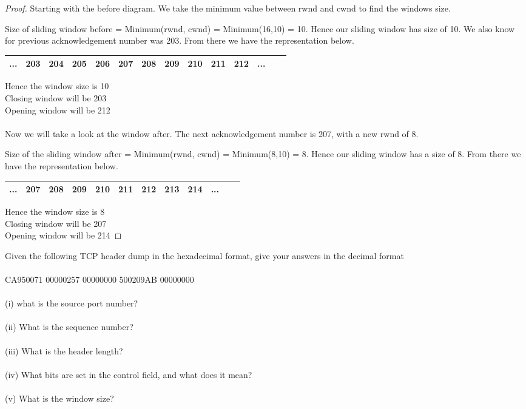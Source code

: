 \documentclass[12pt]{article}
\newenvironment{exercise}[2][Exercise]{\begin{trivlist}
\item[\hskip \labelsep {\bfseries #1}\hskip \labelsep {\bfseries #2.}]}{\end{trivlist}}
\begin{document}
\begin{proof}
Starting with the before diagram. We take the minimum value between rwnd and cwnd to find the windows size.

Size of sliding window before = Minimum(rwnd, cwnd) = Minimum(16,10) = 10. Hence our sliding window has size of 10. We also know for previous acknowledgement number was 203. From there we have the representation below. 

\begin{center}
\begin{tabular}{|c|c|c|c|c|c|c|c|c|c|c|c|c|c|}
\hline
 ... & 203 & 204 & 205 & 206 & 207 & 208 & 209 & 210 & 211 & 212 & ... \\
 \hline 
\end{tabular}
\end{center}
Hence the window size is 10 \\ 
Closing window will be 203 \\ 
Opening window will be 212 \\ \\ 
Now we will take a look at the window after. The next acknowledgement number is 207, with a new rwnd of 8. 

Size of the sliding window after = Minimum(rwnd, cwnd) = Minimum(8,10) = 8. Hence our sliding window has a size of 8. 
From there we have the representation below. 

\begin{center}
\begin{tabular}{|c|c|c|c|c|c|c|c|c|c|c|c|}
\hline
 ... & 207 & 208 & 209 & 210 & 211 & 212 & 213 & 214 & ... \\
 \hline 
\end{tabular}
\end{center}
Hence the window size is 8 \\ 
Closing window will be 207 \\
Opening window will be 214
\end{proof}

\begin{exercise}{15}
Given the following TCP header dump in the hexadecimal format, give your answers in
the decimal format \\ \\
CA950071 00000257 00000000 500209AB 00000000 \\ \\
(i) what is the source port number? \\ \\
(ii) What is the sequence number? \\ \\ 
(iii) What is the header length? \\ \\
(iv) What bits are set in the control field, and what does it mean? \\ \\ 
(v) What is the window size?
\end{exercise}
\end{document}
